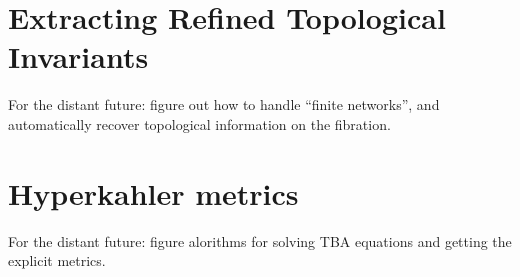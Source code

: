 \documentclass[11pt]{report}
\begin{document}
\chapter{Extracting Refined Topological Invariants}

For the distant future: figure out how to handle ``finite networks'', and automatically recover topological information on the fibration.





\chapter{Hyperkahler metrics}

For the distant future: figure alorithms for solving TBA equations and getting the explicit metrics.
\end{document}
